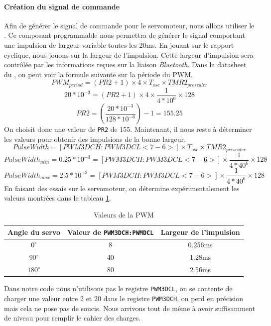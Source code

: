 				\paragraph{Création du signal de commande} Afin de générer le signal de commande pour le servomoteur, nous allons utiliser le \pic. Ce composant programmable nous permettra de générer le signal comportant une impulsion de largeur variable toutes les 20ms. En jouant sur le rapport cyclique, nous jouons sur la largeur de l'impulsion. Cette largeur d'impulsion sera contrôlée par les informations reçues sur la liaison \textit{Bluetooth}. Dans la datasheet du \pic \cite{DatasheetPIC}, on peut voir la formule suivante sur la période du PWM.
				$$ PWM_{period}=(PR2+1)\times 4 \times T_{osc} \times TMR2_{prescaler}$$
				$$ 20*10^{-3}=(PR2+1) \times 4 \times \frac{1}{4*10^{6}} \times 128$$
				$$ PR2=\left(\frac{20*10^{-3}}{128*10^{-6}} \right)-1=155.25$$
				On choisit donc une valeur de \texttt{PR2} de 155. Maintenant, il nous reste à déterminer les valeurs pour obtenir des impulsions de la bonne largeur.
				$$ PulseWidth=[PWM3DCH:PWM3DCL<7-6>]\times T_{osc} \times TMR2_{prescaler}$$
				$$ PulseWidth_{min}=0.25*10^{-3}=[PWM3DCH:PWM3DCL<7-6>]\times \frac{1}{4*40^{6}} \times 128$$
				$$ PulseWidth_{max}=2.5*10^{-3}=[PWM3DCH:PWM3DCL<7-6>]\times \frac{1}{4*40^{6}} \times 128$$
				En faisant des essais sur le servomoteur, on détermine expérimentalement les valeurs montrées dans le tableau \ref{PWMval}.
				\begin{table}[h]
				\begin{center}
					\begin{tabular}{c|c|c}
					
					Angle du servo & Valeur de \texttt{PWM3DCH:PWMDCL} & Largeur de l'impulsion \\ 
					\hline 
					$0^{\circ}$ & 8 & 0.256ms \\
					$90^{\circ}$ & 40 & 1.28ms \\
					$180^{\circ}$ & 80 & 2.56ms \\ 
					
					\end{tabular} 
					\caption{Valeurs de la PWM}
					\label{PWMval}
				\end{center}
				\end{table}
				Dans notre code nous n'utilisons pas le registre \texttt{PWM3DCL}, on se contente de charger une valeur entre 2 et 20 dans le registre \texttt{PWM3DCH}, on perd en précision mais cela ne pose pas de soucis. Nous arrivons tout de même à avoir suffisamment de niveau pour remplir le cahier des charges.

